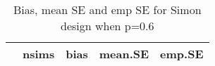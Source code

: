 \begin{table}[ht]
\centering
\begin{tabular}{rrrrr}
  \toprule
 & nsims & bias & mean.SE & emp.SE \\ 
  \midrule
 \bottomrule
\end{tabular}
\caption{Bias, mean SE and emp SE for Simon design when p=0.6} 
\label{tab:simon}
\end{table}
